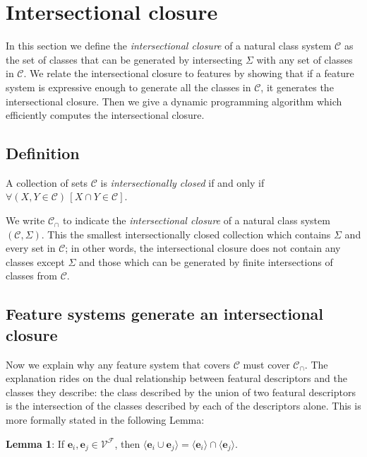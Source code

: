 \documentclass[11pt, oneside]{article}   	%
\begin{document}
\section{Intersectional closure}

In this section we define the \textit{intersectional closure} of a natural class system $\mathcal C$ as the set of classes that can be generated by intersecting $\Sigma$ with any set of classes in $\mathcal C$. We relate the intersectional closure to features by showing that if a feature system is expressive enough to generate all the classes in $\mathcal C$, it generates the intersectional closure. Then we give a dynamic programming algorithm which efficiently computes the intersectional closure. 

\subsection{Definition}

A collection of sets $\mathcal C$ is \textit{intersectionally closed} if and only if $\forall (X, Y \in \mathcal C) \, [ X \cap Y \in \mathcal C]$.

We write $\mathcal C_\cap$ to indicate the \textit{intersectional closure} of a natural class system $(\mathcal C, \Sigma)$. This the smallest intersectionally closed collection which contains $\Sigma$ and every set in $\mathcal C$; in other words, the intersectional closure does not contain any classes except $\Sigma$ and those which can be generated by finite intersections of classes from $\mathcal C$.

\subsection{Feature systems generate an intersectional closure}

Now we explain why any feature system that covers $\mathcal C$ must cover $\mathcal C_\cap$. The explanation rides on the dual relationship between featural descriptors and the classes they describe: the class described by the union of two featural descriptors is the intersection of the classes described by each of the descriptors alone. This is more formally stated in the following Lemma:

\vspace{\baselineskip} \noindent \textbf{Lemma 1}: If $\mathbf{e}_i, \mathbf{e}_j \in \mathcal V^\mathcal F$, then $\langle \mathbf{e}_i \cup \mathbf{e}_j \rangle =  \langle \mathbf{e}_i \rangle \cap \langle \mathbf{e}_j \rangle$.
\end{document}
